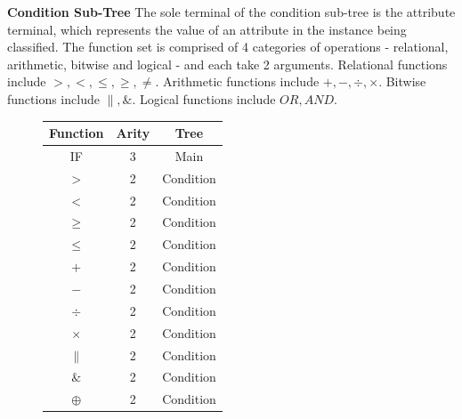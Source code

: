 \documentclass[a4paper,12pt]{article}
\begin{document}
{                \noindent \textbf{Condition Sub-Tree} \newline 
                The sole terminal of the condition sub-tree is the attribute terminal, which represents the value of an attribute in the instance being classified. 
                The function set is comprised of 4 categories of operations - relational, arithmetic, bitwise and logical - and each take 2 arguments. Relational functions include 
                $>,<,\leq,\geq,\neq$. Arithmetic functions include $+,-,\div,\times$. Bitwise functions include $\|, \&$. Logical functions include $OR, AND$.
                \begin{figure}[h!]
                    \begin{minipage}[c]{0.5\textwidth}
                        \centering
                        \begin{tabular}{|c|c|c|}
                            \hline
                            \textbf{Function} & \textbf{Arity} & \textbf{Tree}\\
                            \hline
                            IF & 3 & Main  \\
                            \hline 
                            $>$ & 2 & Condition \\
                            \hline
                            $<$ & 2 & Condition \\
                            \hline
                            $\geq$ & 2 & Condition \\
                            \hline
                            $\leq$ & 2 & Condition \\
                            \hline
                            $+$ & 2 & Condition \\
                            \hline
                            $-$ & 2 & Condition \\
                            \hline
                            $\div$ & 2 & Condition \\
                            \hline
                            $\times$ & 2 & Condition \\
                            \hline
                            $\|$ & 2 & Condition \\
                            \hline
                            $\&$ & 2 & Condition \\
                            \hline
                            $\oplus$ & 2 & Condition \\
                            \hline

\end{tabular}
\end{minipage}
\end{figure}}
\end{document}
